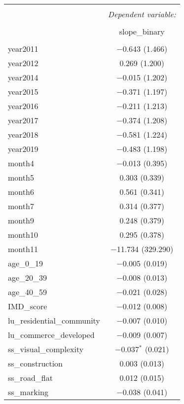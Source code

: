 \begin{table}[!htbp] \centering 
  \caption{} 
  \label{} 
\small 
\begin{tabular}{@{\extracolsep{1pt}}lc} 
\\[-1.8ex]\hline 
\hline \\[-1.8ex] 
 & \multicolumn{1}{c}{\textit{Dependent variable:}} \\ 
\cline{2-2} 
\\[-1.8ex] & slope\_binary \\ 
\hline \\[-1.8ex] 
 year2011 & $-$0.643 (1.466) \\ 
  year2012 & 0.269 (1.200) \\ 
  year2014 & $-$0.015 (1.202) \\ 
  year2015 & $-$0.371 (1.197) \\ 
  year2016 & $-$0.211 (1.213) \\ 
  year2017 & $-$0.374 (1.208) \\ 
  year2018 & $-$0.581 (1.224) \\ 
  year2019 & $-$0.483 (1.198) \\ 
  month4 & $-$0.013 (0.395) \\ 
  month5 & 0.303 (0.339) \\ 
  month6 & 0.561 (0.341) \\ 
  month7 & 0.314 (0.377) \\ 
  month9 & 0.248 (0.379) \\ 
  month10 & 0.295 (0.378) \\ 
  month11 & $-$11.734 (329.290) \\ 
  age\_0\_19 & $-$0.005 (0.019) \\ 
  age\_20\_39 & $-$0.008 (0.013) \\ 
  age\_40\_59 & $-$0.021 (0.028) \\ 
  IMD\_score & $-$0.012 (0.008) \\ 
  lu\_residential\_community & $-$0.007 (0.010) \\ 
  lu\_commerce\_developed & $-$0.009 (0.007) \\ 
  ss\_visual\_complexity & $-$0.037$^{*}$ (0.021) \\ 
  ss\_construction & 0.003 (0.013) \\ 
  ss\_road\_flat & 0.012 (0.015) \\ 
  ss\_marking & $-$0.038 (0.041) \\ 

\end{tabular}
\end{table}
